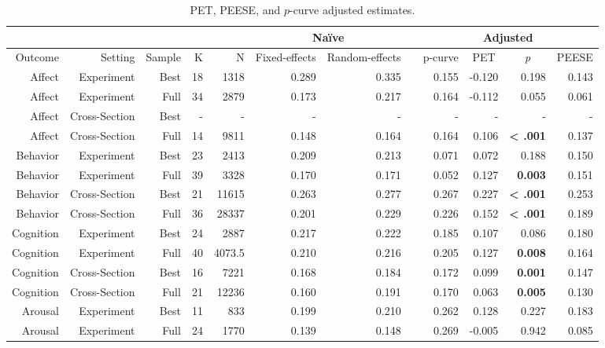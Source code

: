 \documentclass[man]{apa6}
\begin{document}
\begin{table}
	\centering
	\caption{PET, PEESE, and $p$-curve adjusted estimates.}
	\begin{tabular}{rrrrrrrrrrrr}
		\toprule
		&       &       &       &       & \multicolumn{2}{c}{Na{\"i}ve} & \multicolumn{1}{c}{} & \multicolumn{4}{c}{Adjusted} \\
		\midrule
		Outcome & Setting & Sample & K     & N     & \multicolumn{1}{c}{Fixed-effects} & \multicolumn{1}{c}{Random-effects} & \multicolumn{1}{c}{} & \multicolumn{1}{c}{p-curve} & \multicolumn{1}{c}{PET} & \multicolumn{1}{c}{\textit{p}} & \multicolumn{1}{c}{PEESE} \\
		Affect & Experiment & Best  & 18    & 1318  & 0.289 & 0.335 &       & 0.155 & -0.120 & 0.198 & 0.143 \\
		Affect & Experiment & Full  & 34    & 2879  & 0.173 & 0.217 &       & 0.164 & -0.112 & 0.055 & 0.061 \\
		Affect & Cross-Section & Best  & -     & -     & -     & -     &       & -     & -     & -     & - \\
		Affect & Cross-Section & Full  & 14    & 9811  & 0.148 & 0.164 &       & 0.164 & 0.106 & \textbf{< .001} & 0.137 \\
		Behavior & Experiment & Best  & 23    & 2413  & 0.209 & 0.213 &       & 0.071 & 0.072 & 0.188 & 0.150 \\
		Behavior & Experiment & Full  & 39    & 3328  & 0.170 & 0.171 &       & 0.052 & 0.127 & \textbf{0.003} & 0.151 \\
		Behavior & Cross-Section & Best  & 21    & 11615 & 0.263 & 0.277 &       & 0.267 & 0.227 & \textbf{< .001} & 0.253 \\
		Behavior & Cross-Section & Full  & 36    & 28337 & 0.201 & 0.229 &       & 0.226 & 0.152 & \textbf{< .001} & 0.189 \\
		Cognition & Experiment & Best  & 24    & 2887  & 0.217 & 0.222 &       & 0.185 & 0.107 & 0.086 & 0.180 \\
		Cognition & Experiment & Full  & 40    & 4073.5 & 0.210 & 0.216 &       & 0.205 & 0.127 & \textbf{0.008} & 0.164 \\
		Cognition & Cross-Section & Best  & 16    & 7221  & 0.168 & 0.184 &       & 0.172 & 0.099 & \textbf{0.001} & 0.147 \\
		Cognition & Cross-Section & Full  & 21    & 12236 & 0.160 & 0.191 &       & 0.170 & 0.063 & \textbf{0.005} & 0.130 \\
		Arousal & Experiment & Best  & 11    & 833   & 0.199 & 0.210 &       & 0.262 & 0.128 & 0.227 & 0.183 \\
		Arousal & Experiment & Full  & 24    & 1770  & 0.139 & 0.148 &       & 0.269 & -0.005 & 0.942 & 0.085 \\
		\bottomrule
	\end{tabular}%
	\label{table:adjustment}%
\end{table}
\end{document}
